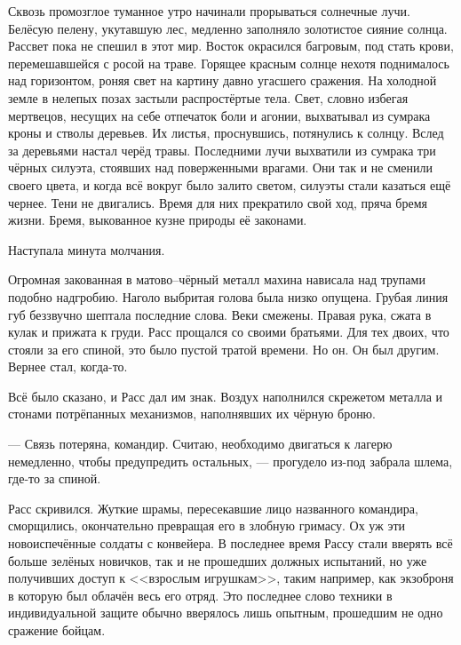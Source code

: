
Сквозь промозглое туманное утро начинали прорываться солнечные лучи. Белёсую 
пелену, укутавшую лес, медленно заполняло золотистое сияние солнца. Рассвет пока 
не спешил в этот мир. Восток окрасился багровым, под стать крови, перемешавшейся 
с росой на траве. Горящее красным солнце нехотя поднималось над горизонтом, 
роняя свет на картину давно угасшего сражения. На холодной земле в нелепых позах 
застыли распростёртые тела. Свет, словно избегая мертвецов, несущих на себе 
отпечаток боли и агонии, выхватывал из сумрака кроны и стволы деревьев. Их 
листья, проснувшись, потянулись к солнцу. Вслед за деревьями настал черёд травы. 
Последними лучи выхватили из сумрака три чёрных силуэта, стоявших над 
поверженными врагами. Они так и не сменили своего цвета, и когда всё вокруг было 
залито светом, силуэты стали казаться ещё чернее. Тени не двигались. Время для 
них прекратило свой ход, пряча бремя жизни. Бремя, выкованное кузне природы её 
законами.

Наступала минута молчания.

Огромная закованная в матово--чёрный металл махина нависала над трупами подобно 
надгробию. Наголо выбритая голова была низко опущена. Грубая линия губ беззвучно 
шептала последние слова. Веки смежены. Правая рука, сжата в кулак и прижата к 
груди. Расс прощался со своими братьями. Для тех двоих, что стояли за его 
спиной, это было пустой тратой времени. Но он. Он был другим. Вернее стал, 
когда-то.

Всё было сказано, и Расс дал им знак. Воздух наполнился скрежетом металла и 
стонами потрёпанных механизмов, наполнявших их чёрную броню.

\noindent --- Связь потеряна, командир. Считаю, необходимо двигаться к лагерю 
немедленно, чтобы предупредить остальных, --- прогудело из-под забрала шлема, 
где-то за спиной.

Расс скривился. Жуткие шрамы, пересекавшие лицо названного командира, 
сморщились, окончательно превращая его в злобную гримасу. Ох уж эти 
новоиспечённые солдаты с конвейера. В последнее время Рассу стали вверять всё 
больше зелёных новичков, так и не прошедших должных испытаний, но уже получивших 
доступ к <<взрослым игрушкам>>, таким например, как экзоброня в которую был 
облачён весь его отряд. Это последнее слово техники в индивидуальной защите 
обычно вверялось лишь опытным, прошедшим не одно сражение бойцам.

